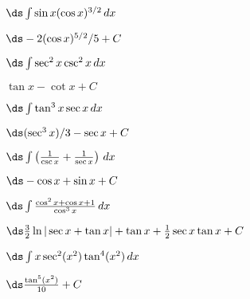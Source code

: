 \begin{enumialphparenastyle}
\begin{ex}
 $\ds\int \sin x (\cos x)^{3/2}\,dx$
\begin{sol}
 $\ds -2(\cos x)^{5/2}/5+C$
\end{sol}
\end{ex}

\begin{ex}
 $\ds\int \sec^2 x\csc^2 x\,dx$
\begin{sol}
 $\tan x-\cot x+C$
\end{sol}
\end{ex}

\begin{ex}
 $\ds\int \tan^3x \sec x\,dx$
\begin{sol}
 $\ds (\sec^3x)/3-\sec x+C$
\end{sol}
\end{ex}

\begin{ex}
 $\ds\int \left(\frac{1}{\csc x}+\frac{1}{\sec x}\right)\,dx$
\begin{sol}
 $\ds -\cos x+\sin x+C$
\end{sol}
\end{ex}

\begin{ex}
 $\ds\int\frac{\cos^2x+\cos x+1}{\cos^3x}\,dx$
\begin{sol}
 $\ds \frac{3}{2}\ln|\sec x+\tan x|+\tan x+\frac{1}{2}\sec x\tan x+C$
\end{sol}
\end{ex}

\begin{ex}
 $\ds\int x\sec^2(x^2)\tan^4(x^2)\,dx$
\begin{sol}
 $\ds \frac{\tan^5(x^2)}{10}+C$
\end{sol}
\end{ex}

\end{enumialphparenastyle}